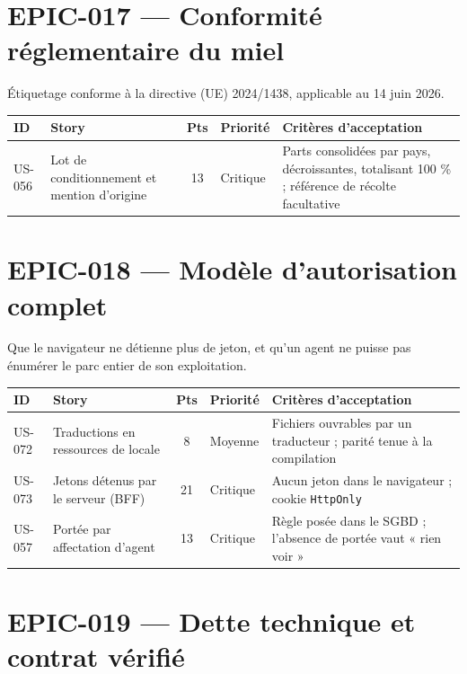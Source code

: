 \section{EPIC-017 --- Conformité réglementaire du miel}

Étiquetage conforme à la directive (UE) 2024/1438, applicable au 14 juin 2026.

\begin{center}
\begin{tabular}{lp{6.6cm}cl p{4.6cm}}
\toprule
\textbf{ID} & \textbf{Story} & \textbf{Pts} & \textbf{Priorité} & \textbf{Critères d'acceptation} \\
\midrule
US-056 & Lot de conditionnement et mention d'origine & 13 & Critique & Parts consolidées par pays, décroissantes, totalisant 100 \% ; référence de récolte facultative \\
\bottomrule
\end{tabular}
\end{center}

\section{EPIC-018 --- Modèle d'autorisation complet}

Que le navigateur ne détienne plus de jeton, et qu'un agent ne puisse pas
énumérer le parc entier de son exploitation.

\begin{center}
\begin{tabular}{lp{6.6cm}cl p{4.6cm}}
\toprule
\textbf{ID} & \textbf{Story} & \textbf{Pts} & \textbf{Priorité} & \textbf{Critères d'acceptation} \\
\midrule
US-072 & Traductions en ressources de locale  & 8  & Moyenne  & Fichiers ouvrables par un traducteur ; parité tenue à la compilation \\
US-073 & Jetons détenus par le serveur (BFF)  & 21 & Critique & Aucun jeton dans le navigateur ; cookie \texttt{HttpOnly} \\
US-057 & Portée par affectation d'agent       & 13 & Critique & Règle posée dans le SGBD ; l'absence de portée vaut « rien voir » \\
\bottomrule
\end{tabular}
\end{center}

\section{EPIC-019 --- Dette technique et contrat vérifié}

